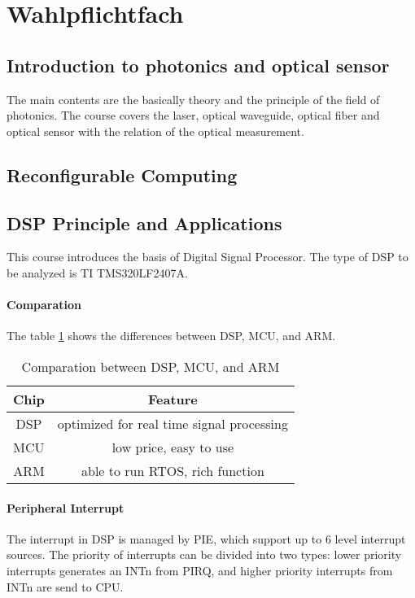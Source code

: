 \section{Wahlpflichtfach}

\subsection{Introduction to photonics and optical sensor}
The main contents are the basically theory and the principle of the field of photonics. The course covers the laser, optical waveguide, optical fiber and optical sensor with the relation of the optical measurement.

\subsection{Reconfigurable Computing}

\subsection{DSP Principle and Applications}

This course introduces the basis of Digital Signal Processor. The type of DSP to be analyzed is TI TMS320LF2407A.

\paragraph{Comparation} The table \ref{tab_chip} shows the differences between DSP, MCU, and ARM.

\begin{table}
  \centering
  \caption{Comparation between DSP, MCU, and ARM}
  \label{tab_chip}
  \begin{tabular}{|c|c|}
    \hline
    Chip & Feature \\
    \hline
    DSP & optimized for real time signal processing \\
    MCU & low price, easy to use \\
    ARM & able to run RTOS, rich function \\
    \hline
  \end{tabular}
\end{table}

\paragraph{Peripheral Interrupt} The interrupt in DSP is managed by PIE, which support up to 6 level interrupt sources. The priority of interrupts can be divided into two types: lower priority interrupts generates an INTn from PIRQ, and higher priority interrupts from INTn are send to CPU.

